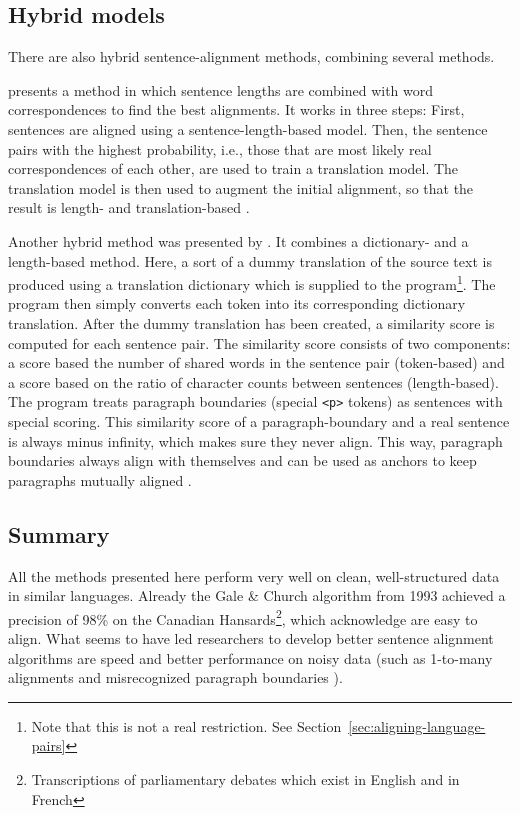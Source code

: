 \subsection{Hybrid models}
\label{sec:hybrid-models}
There are also hybrid sentence-alignment methods, combining several methods.


\cite{moore2002fast} presents a method in which sentence lengths are combined with word correspondences to find the best alignments. 
It works in three steps:
First, sentences are aligned using a sentence-length-based model. 
Then, the sentence pairs with the highest probability, i.e., those that are most likely real correspondences of each other, are used to train a translation model. 
The translation model is then used to augment the initial alignment, so that the result is length- and translation-based \autocite{moore2002fast}.

Another hybrid method was presented by \cite{hunalign}. 
It combines a dictionary- and a length-based method.
Here, a sort of a dummy translation of the source text is produced using a translation dictionary which is supplied to the program\footnote{Note that this is not a real restriction. See Section~\ref{sec:aligning-language-pairs}}. 
The program then simply converts each token into its corresponding dictionary translation.
After the dummy translation has been created, a similarity score is computed for each sentence pair.
The similarity score consists of two components: a score based the number of shared words in the sentence pair (token-based) and  a score based on the ratio of character counts between sentences (length-based). 
The program treats paragraph boundaries (special \texttt{<p>} tokens) as sentences with special scoring. 
This similarity score of a paragraph-boundary  and a real sentence is always minus infinity, which makes sure they never align. This way, paragraph boundaries always align with themselves and can be used as anchors to keep  paragraphs mutually aligned \autocite{hunalign}.

\subsection{Summary}
All the methods presented here perform very well on clean, well-structured data in similar languages. Already the Gale \& Church algorithm from 1993 achieved a precision of 98\% on the Canadian Hansards\footnote{Transcriptions of parliamentary debates which exist in English and in French}, which \citeauthor{gale-church-1991-program} acknowledge are easy to align. 
What seems to have led researchers to develop better sentence alignment algorithms are speed \autocites{chen-1993-aligning,hunalign} and better performance on noisy data (such as 1-to-many alignments and misrecognized paragraph boundaries \autocite{sennrich-volk-2010-mt}). 

